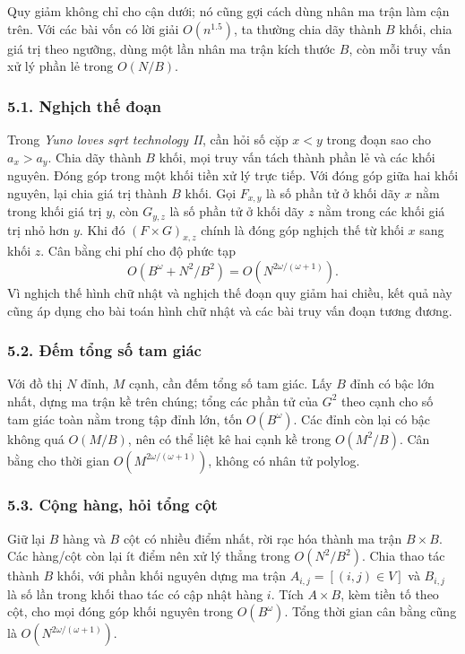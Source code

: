 \documentclass[11pt]{article}
\begin{document}
Quy giảm không chỉ cho cận dưới; nó cũng gợi cách dùng nhân ma trận làm cận
trên. Với các bài vốn có lời giải \(O(n^{1.5})\), ta thường chia dãy thành
\(B\) khối, chia giá trị theo ngưỡng, dùng một lần nhân ma trận kích thước
\(B\), còn mỗi truy vấn xử lý phần lẻ trong \(O(N/B)\).

\subsubsection*{5.1. Nghịch thế đoạn}

Trong \emph{Yuno loves sqrt technology II}, cần hỏi số cặp \(x<y\) trong đoạn
sao cho \(a_x>a_y\). Chia dãy thành \(B\) khối, mọi truy vấn tách thành phần
lẻ và các khối nguyên. Đóng góp trong một khối tiền xử lý trực tiếp. Với đóng
góp giữa hai khối nguyên, lại chia giá trị thành \(B\) khối. Gọi \(F_{x,y}\)
là số phần tử ở khối dãy \(x\) nằm trong khối giá trị \(y\), còn \(G_{y,z}\)
là số phần tử ở khối dãy \(z\) nằm trong các khối giá trị nhỏ hơn \(y\). Khi đó
\((F\times G)_{x,z}\) chính là đóng góp nghịch thế từ khối \(x\) sang khối
\(z\). Cân bằng chi phí cho độ phức tạp
\[
  O(B^\omega+N^2/B^2)=O(N^{2\omega/(\omega+1)}).
\]
Vì nghịch thế hình chữ nhật và nghịch thế đoạn quy giảm hai chiều, kết quả này
cũng áp dụng cho bài toán hình chữ nhật và các bài truy vấn đoạn tương đương.

\subsubsection*{5.2. Đếm tổng số tam giác}

Với đồ thị \(N\) đỉnh, \(M\) cạnh, cần đếm tổng số tam giác. Lấy \(B\) đỉnh có
bậc lớn nhất, dựng ma trận kề trên chúng; tổng các phần tử của \(G^2\) theo
cạnh cho số tam giác toàn nằm trong tập đỉnh lớn, tốn \(O(B^\omega)\). Các
đỉnh còn lại có bậc không quá \(O(M/B)\), nên có thể liệt kê hai cạnh kề trong
\(O(M^2/B)\). Cân bằng cho thời gian \(O(M^{2\omega/(\omega+1)})\), không có
nhân tử polylog.

\subsubsection*{5.3. Cộng hàng, hỏi tổng cột}

Giữ lại \(B\) hàng và \(B\) cột có nhiều điểm nhất, rời rạc hóa thành ma trận
\(B\times B\). Các hàng/cột còn lại ít điểm nên xử lý thẳng trong
\(O(N^2/B^2)\). Chia thao tác thành \(B\) khối, với phần khối nguyên dựng ma
trận \(A_{i,j}=[(i,j)\in V]\) và \(B_{i,j}\) là số lần trong khối thao tác có
cập nhật hàng \(i\). Tích \(A\times B\), kèm tiền tố theo cột, cho mọi đóng
góp khối nguyên trong \(O(B^\omega)\). Tổng thời gian cân bằng cũng là
\(O(N^{2\omega/(\omega+1)})\).
\end{document}
